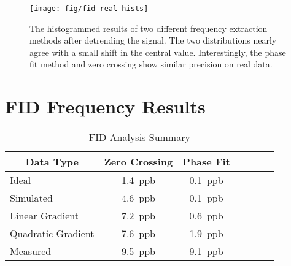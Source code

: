 \begin{figure}
\centering
\texttt{[image: fig/fid-real-hists]}
\caption{
    The histogrammed results of two different frequency extraction methods after detrending the signal.  The two distributions nearly agree with a small shift in the central value.  Interestingly, the phase fit method and zero crossing show similar precision on real data.
    \label{fig:fid-real-hists}
}
\end{figure}

\section{FID Frequency Results}

\begin{table}[h]
\label{tab:fid-analysis-summary}
\caption{FID Analysis Summary}
\centering
\begin{tabular}{l c c c c c c}
    \hline
    \multicolumn{1}{c}{Data Type} & Zero Crossing & Phase Fit \\
    \hline
    Ideal                & \SI{1.4}{ppb}  & \SI{0.1}{ppb} \\
    Simulated            & \SI{4.6}{ppb}  & \SI{0.1}{ppb} \\
    Linear Gradient      & \SI{7.2}{ppb}  & \SI{0.6}{ppb} \\
    Quadratic Gradient   & \SI{7.6}{ppb}  & \SI{1.9}{ppb} \\
    Measured             & \SI{9.5}{ppb}  & \SI{9.1}{ppb} \\
    \hline
\end{tabular}
\end{table}
